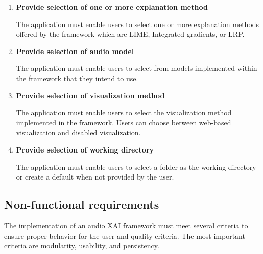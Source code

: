 \documentclass[
    bindingoffset=5mm,  %
    footnoteindent=3mm, %
    hyphenation=true    %
]{src/wut-thesis}
\begin{document}
    \begin{enumerate}[itemsep=1\baselineskip]

    \item \textbf{Provide selection of one or more explanation method}

        The application must enable users to select one or more explanation methods offered by the framework which are LIME, Integrated gradients, or LRP.

    \item \textbf{Provide selection of audio model}

            The application must enable users to select from models implemented within the framework that they
        intend to use. 

    \item \textbf{Provide selection of visualization method}

        The application must enable users to select the visualization method implemented in the framework.
    Users can choose between web-based visualization and disabled visualization.

    \item \textbf{Provide selection of working directory}

    The application must enable users to select a folder as the working directory or create a default when not provided by the user.

    \end{enumerate}

\subsection{Non-functional requirements} \label{ch:NonFuncRequirements}

    The implementation of an audio XAI framework must meet several criteria
    to ensure proper behavior for the user and quality criteria.
    The most important criteria are modularity, usability, and persistency.
\end{document}
